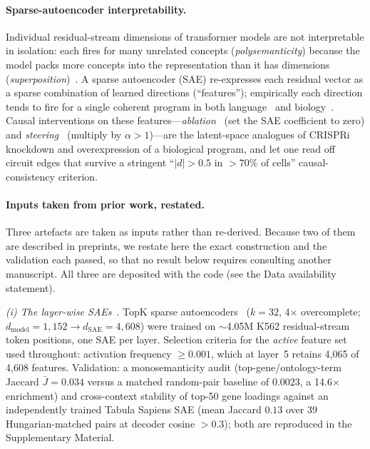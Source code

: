 \documentclass[11pt,onecolumn]{article}
\begin{document}
\paragraph{Sparse-autoencoder interpretability.}
Individual residual-stream dimensions of transformer models are not interpretable in isolation: each fires for many unrelated concepts (\emph{polysemanticity}) because the model packs more concepts into the representation than it has dimensions (\emph{superposition})~\citep{elhage2022superposition,bricken2023monosemanticity}. A sparse autoencoder (SAE) re-expresses each residual vector as a sparse combination of learned directions (``features''); empirically each direction tends to fire for a single coherent program in both language~\citep{cunningham2023sparse,templeton2024scaling} and biology~\citep{kendiukhov2025sae_atlas}. Causal interventions on these features---\emph{ablation}~\citep{pearl2009causality,vig2020causal,geiger2021causal} (set the SAE coefficient to zero) and \emph{steering}~\citep{turner2023activation,li2024inference,zou2023representation} (multiply by $\alpha>1$)---are the latent-space analogues of CRISPRi knockdown and overexpression of a biological program, and let one read off circuit edges that survive a stringent ``$|d|>0.5$ in $>70\%$ of cells'' causal-consistency criterion.

\paragraph{Inputs taken from prior work, restated.}
Three artefacts are taken as inputs rather than re-derived. Because two of them are described in preprints, we restate here the exact construction and the validation each passed, so that no result below requires consulting another manuscript. All three are deposited with the code (see the Data availability statement).

\emph{(i) The layer-wise SAEs}~\citep{kendiukhov2025sae_atlas}. TopK sparse autoencoders~\citep{makhzani2013ksparse} ($k=32$, 4$\times$ overcomplete; $d_\mathrm{model}=1{,}152 \to d_\mathrm{SAE}=4{,}608$) were trained on $\sim$4.05M K562 residual-stream token positions, one SAE per layer. Selection criteria for the \emph{active} feature set used throughout: activation frequency $\geq 0.001$, which at layer~5 retains 4{,}065 of 4{,}608 features. Validation: a monosemanticity audit (top-gene/ontology-term Jaccard $\bar J = 0.034$ versus a matched random-pair baseline of $0.0023$, a 14.6$\times$ enrichment) and cross-context stability of top-50 gene loadings against an independently trained Tabula Sapiens SAE (mean Jaccard $0.13$ over 39 Hungarian-matched pairs at decoder cosine $>0.3$); both are reproduced in the Supplementary Material.
\end{document}
